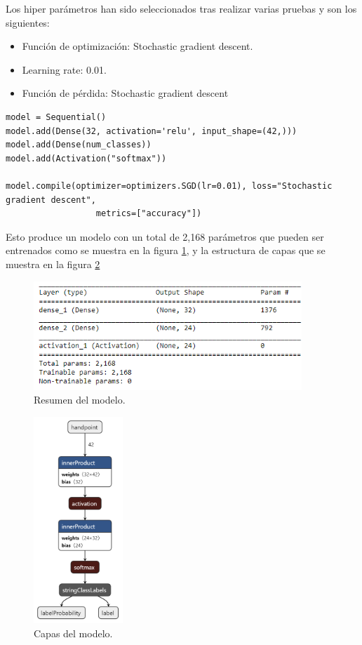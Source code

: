 \documentclass[../main.tex]{subfiles}
\begin{document}
Los hiper parámetros han sido seleccionados tras realizar varias pruebas y son los siguientes:
\begin{itemize}
    \item Función de optimización: Stochastic gradient descent.
    \item Learning rate: 0.01.
    \item Función de pérdida: Stochastic gradient descent
\end{itemize}
\begin{lstlisting}[style=stylepython]
model = Sequential()
model.add(Dense(32, activation='relu', input_shape=(42,)))
model.add(Dense(num_classes))
model.add(Activation("softmax"))

model.compile(optimizer=optimizers.SGD(lr=0.01), loss="Stochastic gradient descent",
                  metrics=["accuracy"])
\end{lstlisting}

Esto produce un modelo con un total de 2,168 parámetros que pueden ser entrenados como se muestra en la figura \ref{figure15}, y la estructura de capas que se muestra en la figura \ref{figure16} 



\begin{figure}[h]
\centering 
\includegraphics[width=0.9\textwidth]{images/modelo/summaryModel.PNG}
\caption{Resumen del modelo.}
\label{figure15}
\end{figure}

\begin{figure}[h]
\centering 
\includegraphics[width=0.3\textwidth]{images/modelo/ASLHandPointTFG.png}
\caption{Capas del modelo.}
\label{figure16}
\end{figure}
\end{document}
